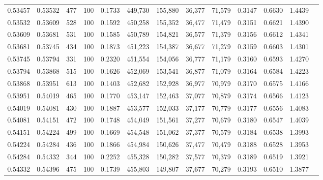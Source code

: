 \begin{tabular}{rrrrrrrrrrrrr}
0.53457 & 0.53532 &   477 & 100 &                                     0.1733 & 449,730 & 155,880 &  36,377 &  71,579 & 0.3147 & 0.6630 & 1.4439 \\
0.53532 & 0.53609 &   528 & 100 &                                     0.1592 & 450,258 & 155,352 &  36,477 &  71,479 & 0.3151 & 0.6621 & 1.4390 \\
0.53609 & 0.53681 &   531 & 100 &                                     0.1585 & 450,789 & 154,821 &  36,577 &  71,379 & 0.3156 & 0.6612 & 1.4341 \\
0.53681 & 0.53745 &   434 & 100 &                                     0.1873 & 451,223 & 154,387 &  36,677 &  71,279 & 0.3159 & 0.6603 & 1.4301 \\
0.53745 & 0.53794 &   331 & 100 &                                     0.2320 & 451,554 & 154,056 &  36,777 &  71,179 & 0.3160 & 0.6593 & 1.4270 \\
0.53794 & 0.53868 &   515 & 100 &                                     0.1626 & 452,069 & 153,541 &  36,877 &  71,079 & 0.3164 & 0.6584 & 1.4223 \\
0.53868 & 0.53951 &   613 & 100 &                                     0.1403 & 452,682 & 152,928 &  36,977 &  70,979 & 0.3170 & 0.6575 & 1.4166 \\
0.53951 & 0.54019 &   465 & 100 &                                     0.1770 & 453,147 & 152,463 &  37,077 &  70,879 & 0.3174 & 0.6566 & 1.4123 \\
0.54019 & 0.54081 &   430 & 100 &                                     0.1887 & 453,577 & 152,033 &  37,177 &  70,779 & 0.3177 & 0.6556 & 1.4083 \\
0.54081 & 0.54151 &   472 & 100 &                                     0.1748 & 454,049 & 151,561 &  37,277 &  70,679 & 0.3180 & 0.6547 & 1.4039 \\
0.54151 & 0.54224 &   499 & 100 &                                     0.1669 & 454,548 & 151,062 &  37,377 &  70,579 & 0.3184 & 0.6538 & 1.3993 \\
0.54224 & 0.54284 &   436 & 100 &                                     0.1866 & 454,984 & 150,626 &  37,477 &  70,479 & 0.3188 & 0.6528 & 1.3953 \\
0.54284 & 0.54332 &   344 & 100 &                                     0.2252 & 455,328 & 150,282 &  37,577 &  70,379 & 0.3189 & 0.6519 & 1.3921 \\
0.54332 & 0.54396 &   475 & 100 &                                     0.1739 & 455,803 & 149,807 &  37,677 &  70,279 & 0.3193 & 0.6510 & 1.3877 \\

\end{tabular}
